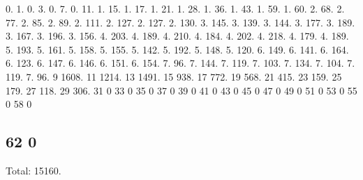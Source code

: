 0. 1. 0. 3. 0. 7. 0. 11. 1. 15. 1. 17. 1. 21. 1. 28. 1. 36. 1. 43. 1. 59. 1. 60. 2. 68. 2. 77. 2. 85. 2. 89. 2. 111. 2. 127. 2. 127. 2. 130. 3. 145. 3. 139. 3. 144. 3. 177. 3. 189. 3. 167. 3. 196. 3. 156. 4. 203. 4. 189. 4. 210. 4. 184. 4. 202. 4. 218. 4. 179. 4. 189. 5. 193. 5. 161. 5. 158. 5. 155. 5. 142. 5. 192. 5. 148. 5. 120. 6. 149. 6. 141. 6. 164. 6. 123. 6. 147. 6. 146. 6. 151. 6. 154. 7. 96. 7. 144. 7. 119. 7. 103. 7. 134. 7. 104. 7. 119. 7. 96. 9 1608. 11 1214. 13 1491. 15 938. 17 772. 19 568. 21 415. 23 159. 25 179. 27 118. 29 306. 31 0 33 0 35 0 37 0 39 0 41 0 43 0 45 0 47 0 49 0 51 0 53 0 55 0 58 0 \subsection*{62 0 }

Total\+: 15160. 